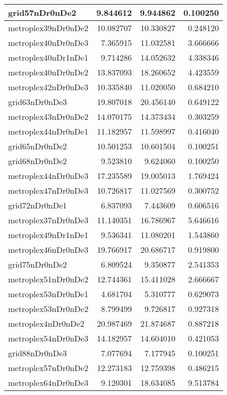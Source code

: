 \begin{longtable}{|l|r|r|r|}
grid57nDr0nDe2 & 9.844612 & 9.944862 & 0.100250 \\\hline
metroplex39nDr0nDe2 & 10.082707 & 10.330827 & 0.248120 \\\hline
metroplex40nDr0nDe3 & 7.365915 & 11.032581 & 3.666666 \\\hline
metroplex40nDr1nDe1 & 9.714286 & 14.052632 & 4.338346 \\\hline
metroplex40nDr0nDe2 & 13.837093 & 18.260652 & 4.423559 \\\hline
metroplex42nDr0nDe3 & 10.335840 & 11.020050 & 0.684210 \\\hline
grid63nDr0nDe3 & 19.807018 & 20.456140 & 0.649122 \\\hline
metroplex43nDr0nDe2 & 14.070175 & 14.373434 & 0.303259 \\\hline
metroplex44nDr0nDe1 & 11.182957 & 11.598997 & 0.416040 \\\hline
grid65nDr0nDe2 & 10.501253 & 10.601504 & 0.100251 \\\hline
grid68nDr0nDe2 & 9.523810 & 9.624060 & 0.100250 \\\hline
metroplex44nDr0nDe3 & 17.235589 & 19.005013 & 1.769424 \\\hline
metroplex47nDr0nDe3 & 10.726817 & 11.027569 & 0.300752 \\\hline
grid72nDr0nDe1 & 6.837093 & 7.443609 & 0.606516 \\\hline
metroplex37nDr0nDe3 & 11.140351 & 16.786967 & 5.646616 \\\hline
metroplex49nDr1nDe1 & 9.536341 & 11.080201 & 1.543860 \\\hline
metroplex46nDr0nDe3 & 19.766917 & 20.686717 & 0.919800 \\\hline
grid75nDr0nDe2 & 6.809524 & 9.350877 & 2.541353 \\\hline
metroplex51nDr0nDe2 & 12.744361 & 15.411028 & 2.666667 \\\hline
metroplex53nDr0nDe1 & 4.681704 & 5.310777 & 0.629073 \\\hline
metroplex53nDr0nDe2 & 8.799499 & 9.726817 & 0.927318 \\\hline
metroplex4nDr0nDe2 & 20.987469 & 21.874687 & 0.887218 \\\hline
metroplex54nDr0nDe3 & 14.182957 & 14.604010 & 0.421053 \\\hline
grid88nDr0nDe3 & 7.077694 & 7.177945 & 0.100251 \\\hline
metroplex57nDr0nDe2 & 12.273183 & 12.759398 & 0.486215 \\\hline
metroplex64nDr0nDe3 & 9.120301 & 18.634085 & 9.513784 \\\hline

\end{longtable}
